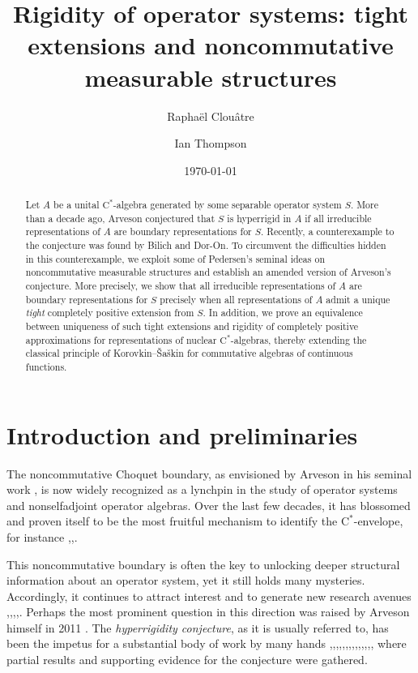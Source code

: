 \documentclass[10pt]{amsart}
\date{\today}
\author{Rapha\"el Clou\^atre}
\author{Ian Thompson}
\title[Rigidity of operator systems]{Rigidity of operator systems: tight extensions and noncommutative measurable structures}
\newcommand{\rC}{\mathrm{C}}
\theoremstyle{definition}
\begin{document}
\begin{abstract}
Let $A$ be a unital $\rC^*$-algebra generated by some separable operator system $S$.
More than a decade ago, Arveson conjectured that $S$ is hyperrigid in $A$ if all irreducible representations of $A$ are boundary representations for $S$. Recently, a counterexample to the conjecture was found by Bilich and Dor-On. To circumvent the difficulties hidden in this counterexample, we exploit some of  Pedersen's seminal ideas on noncommutative measurable structures 
and establish an amended version of Arveson's conjecture. More precisely, we show that all irreducible representations of $A$ are boundary representations for $S$ precisely when all representations of $A$ admit a unique \emph{tight} completely positive extension from $S$.  In addition, we prove an equivalence between uniqueness of such tight extensions and rigidity of completely positive approximations for representations of nuclear $\rC^*$-algebras, thereby extending the classical principle of Korovkin--\v Sa\v skin for commutative algebras of continuous functions.
\end{abstract}
\maketitle


\section{Introduction  and preliminaries}\label{S:Introduction}

The noncommutative Choquet boundary, as envisioned by Arveson in his seminal work \cite{arveson1969subalgebras}, is now widely recognized  as a lynchpin in the study of operator systems and  nonselfadjoint operator algebras. Over the last few decades, it has blossomed and proven itself to be the most fruitful mechanism to identify the $\rC^*$-envelope, for instance \cite{dritschel2005boundary},\cite{arveson2008noncommutative},\cite{davidson2015choquet}.

This noncommutative boundary is often the key to unlocking deeper structural information about an operator system, yet it still holds many mysteries. Accordingly, it continues to attract interest and to generate new research avenues \cite{davidson2019noncommutative},\cite{clouatre2020finite},\cite{kennedy2021noncommutative},\cite{davidson2022strongly},\cite{clouatre2023minimal}.
Perhaps the most prominent question in this direction was raised by Arveson himself in 2011 \cite{arveson2011noncommutative}. The \emph{hyperrigidity conjecture}, as it is usually referred to, has been the impetus for a substantial body of work by many hands \cite{kleski2014korovkin},\cite{kennedy2015essential},\cite{dor2018full},\cite{clouatre2018multiplier},\cite{clouatre2018non},\cite{clouatre2018unperforated},\cite{salomon2019hyperrigid},\cite{HK2019},\cite{KR2020},\cite{kim2021},\cite{davidson2021choquet},\cite{CT2021},\cite{clouatre2023boundary},\cite{thompson2024approximate},\cite{PS2024} where partial results and supporting evidence for the conjecture were gathered. 
\end{document}
